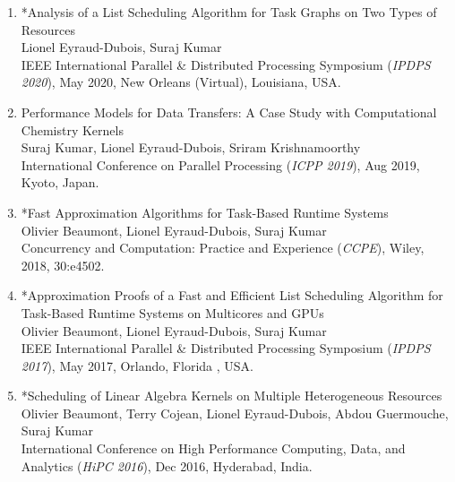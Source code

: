 \documentclass[letterpaper,11pt]{article}
\begin{document}
\begin{enumerate}
	\item *Analysis of a List Scheduling Algorithm for Task Graphs on Two Types of Resources\\
	Lionel Eyraud-Dubois, Suraj Kumar\\
	IEEE International Parallel \& Distributed Processing Symposium (\textit{IPDPS 2020}), May 2020, New Orleans (Virtual), Louisiana, USA.
	\item Performance Models for Data Transfers: A Case Study with Computational Chemistry Kernels\\
	Suraj Kumar, Lionel Eyraud-Dubois, Sriram Krishnamoorthy\\
	International Conference on Parallel Processing (\textit{ICPP 2019}), Aug 2019, Kyoto, Japan.
	\item *Fast Approximation Algorithms for Task-Based Runtime Systems\\
	Olivier Beaumont, Lionel Eyraud-Dubois, Suraj Kumar\\
	Concurrency and Computation: Practice and Experience (\textit{CCPE}), Wiley, 2018, 30:e4502.
	\item *Approximation Proofs of a Fast and Efficient List Scheduling Algorithm for Task-Based Runtime Systems on Multicores and GPUs\\
	Olivier Beaumont, Lionel Eyraud-Dubois, Suraj Kumar\\
	IEEE International Parallel \& Distributed Processing Symposium (\textit{IPDPS 2017}), May 2017, Orlando, Florida , USA.
	
	\item *Scheduling of Linear Algebra Kernels on Multiple Heterogeneous Resources\\
	Olivier Beaumont, Terry Cojean, Lionel Eyraud-Dubois, Abdou Guermouche, Suraj Kumar\\
	International Conference on High Performance Computing, Data, and Analytics (\textit{HiPC 2016}), Dec 2016, Hyderabad, India.
	

\end{enumerate}
\end{document}
